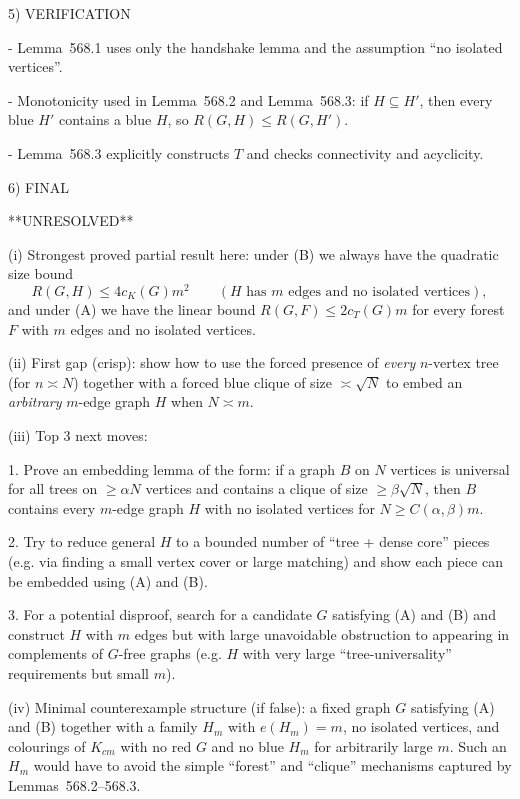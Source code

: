 5) VERIFICATION

- Lemma~568.1 uses only the handshake lemma and the assumption ``no isolated vertices''.

- Monotonicity used in Lemma~568.2 and Lemma~568.3: if $H\subseteq H'$, then every blue $H'$ contains a blue $H$, so $R(G,H)\le R(G,H')$.

- Lemma~568.3 explicitly constructs $T$ and checks connectivity and acyclicity.

6) FINAL

**UNRESOLVED**

(i) Strongest proved partial result here: under (B) we always have the quadratic size bound
\[
R(G,H)\le 4c_K(G)m^2\qquad (H\text{ has }m\text{ edges and no isolated vertices}),
\]
and under (A) we have the linear bound $R(G,F)\le 2c_T(G)m$ for every forest $F$ with $m$ edges and no isolated vertices.

(ii) First gap (crisp): show how to use the forced presence of \emph{every} $n$-vertex tree (for $n\asymp N$) together with a forced blue clique of size $\asymp\sqrt N$ to embed an \emph{arbitrary} $m$-edge graph $H$ when $N\asymp m$.

(iii) Top 3 next moves:

1. Prove an embedding lemma of the form: if a graph $B$ on $N$ vertices is universal for all trees on $\ge \alpha N$ vertices and contains a clique of size $\ge \beta\sqrt N$, then $B$ contains every $m$-edge graph $H$ with no isolated vertices for $N\ge C(\alpha,\beta)m$.

2. Try to reduce general $H$ to a bounded number of ``tree + dense core'' pieces (e.g. via finding a small vertex cover or large matching) and show each piece can be embedded using (A) and (B).

3. For a potential disproof, search for a candidate $G$ satisfying (A) and (B) and construct $H$ with $m$ edges but with large unavoidable obstruction to appearing in complements of $G$-free graphs (e.g. $H$ with very large ``tree-universality'' requirements but small $m$).

(iv) Minimal counterexample structure (if false): a fixed graph $G$ satisfying (A) and (B) together with a family $H_m$ with $e(H_m)=m$, no isolated vertices, and colourings of $K_{c m}$ with no red $G$ and no blue $H_m$ for arbitrarily large $m$. Such an $H_m$ would have to avoid the simple ``forest'' and ``clique'' mechanisms captured by Lemmas~568.2--568.3.




